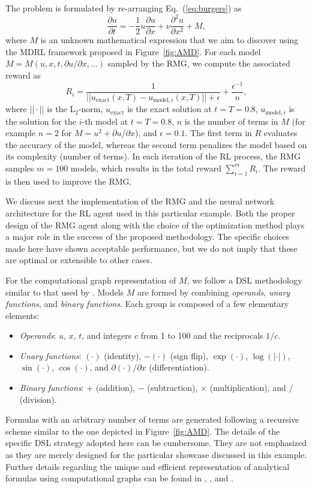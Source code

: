 \documentclass{article}
\begin{document}
The problem is formulated by re-arranging Eq.~(\ref{eq:burgers}) as
\begin{equation}\label{eq:burgersM}
  \frac{\partial u}{\partial t} =
  -\frac{1}{2}u\frac{\partial u}{\partial x} + \nu \frac{\partial^2 u}{ \partial x^2} +M, 
\end{equation}
where $M$ is an unknown mathematical expression that we aim to
discover using the MDRL framework proposed in
Figure~\ref{fig:AMD}. For each model $M=M(u,x,t,\partial u/\partial
x,...)$ sampled by the RMG, we compute the associated reward as
\begin{equation}
    R_i = \frac{1}{||u_{\mathrm{exact}}(x,T)-u_{\mathrm{model},i}(x,T)||+\epsilon} + \frac{\epsilon^{-1}}{n},
\end{equation}
where $||\cdot||$ is the L$_2$-norm, $u_{\mathrm{exact}}$ is the exact
solution at $t=T=0.8$, $u_{\mathrm{model},i}$ is the solution for the
$i$-th model at $t=T=0.8$, $n$ is the number of terms in $M$ (for
example $n=2$ for $M= u^2+\partial u/\partial x$), and
$\epsilon=0.1$. The first term in $R$ evaluates the accuracy of the
model, whereas the second term penalizes the model based on its
complexity (number of terms).  In each iteration of the RL process,
the RMG samples $m=100$ models, which results in the total
reward $\sum_{i=1}^m R_i$. The reward is then used to improve the RMG.

We discuss next the implementation of the RMG and the neural network
architecture for the RL agent used in this particular example. Both
the proper design of the RMG agent along with the choice of the
optimization method plays a major role in the success of the proposed
methodology. The specific choices made here have shown acceptable
performance, but we do not imply that these are optimal or extensible
to other cases.

For the computational graph representation of $M$, we follow a DSL
methodology similar to that used by \citet{bello2017neural}. Models
$M$ are formed by combining \emph{operands}, \emph{unary functions},
and \emph{binary functions}. Each group is composed of a few
elementary elements:
\begin{itemize}
\item \emph{Operands}: $u$, $x$, $t$, and integers $c$ from 1 to 100
  and the reciprocals $1/c$.
  \item{\emph{Unary functions}: $(\cdot)$ (identity), $-(\cdot)$ (sign
    flip), $\exp(\cdot)$, $\log(|\cdot|)$, $\sin(\cdot)$,
    $\cos(\cdot)$, and $\partial(\cdot)/\partial x$
    (differentiation).}
  \item \emph{Binary functions}: $+$ (addition), $-$ (subtraction),
    $\times$ (multiplication), and $/$ (division).
\end{itemize}
Formulas with an arbitrary number of terms are generated following a
recursive scheme similar to the one depicted in
Figure~\ref{fig:AMD}. The details of the specific DSL strategy adopted
here can be cumbersome. They are not emphasized as they are merely
designed for the particular showcase discussed in this
example. Further details regarding the unique and efficient
representation of analytical formulas using computational graphs can
be found in \citet{bello2017neural}, \citet{luo2018automatic}, and
\citet{lample2019deep}.
\end{document}
